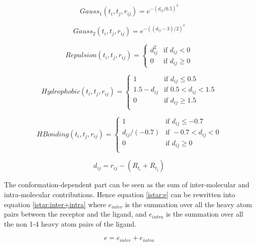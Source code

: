 \begin{equation}
\label{istar:Gauss1}
Gauss_1(t_i, t_j, r_{ij}) = e^{-(d_{ij} / 0.5)^2}
\end{equation}

\begin{equation}
\label{istar:Gauss2}
Gauss_2(t_i, t_j, r_{ij}) = e^{-((d_{ij} - 3) / 2)^2}
\end{equation}

\begin{equation}
\label{istar:Repulsion}
Repulsion(t_i, t_j, r_{ij}) =
\begin{cases}
d_{ij}^2 & \text{if } d_{ij} < 0\\
0 &\text{if } d_{ij} \geq 0
\end{cases}
\end{equation}

\begin{equation}
\label{istar:Hydrophobic}
Hydrophobic(t_i, t_j, r_{ij}) =
\begin{cases}
1 & \text{if } d_{ij} \leq 0.5\\
1.5 - d_{ij} & \text{if } 0.5 < d_{ij} < 1.5\\
0 & \text{if } d_{ij} \geq 1.5\\
\end{cases}
\end{equation}

\begin{equation}
\label{istar:HBonding}
HBonding(t_i, t_j, r_{ij}) =
\begin{cases}
1 & \text{if } d_{ij} \leq -0.7\\
d_{ij} / (-0.7) & \text{if } -0.7 < d_{ij} < 0\\
0 & \text{if } d_{ij} \geq 0\\
\end{cases}
\end{equation}

\begin{equation}
\label{istar:d_ij}
d_{ij} = r_{ij} - (R_{t_i} + R_{t_j})
\end{equation}

The conformation-dependent part can be seen as the sum of inter-molecular and intra-molecular contributions. Hence equation \eqref{istar:e} can be rewritten into equation \eqref{istar:inter+intra} where $e_{inter}$ is the summation over all the heavy atom pairs between the receptor and the ligand, and $e_{intra}$ is the summation over all the non 1-4 heavy atom pairs of the ligand.

\begin{equation}
\label{istar:inter+intra}
e = e_{inter} + e_{intra}
\end{equation}

